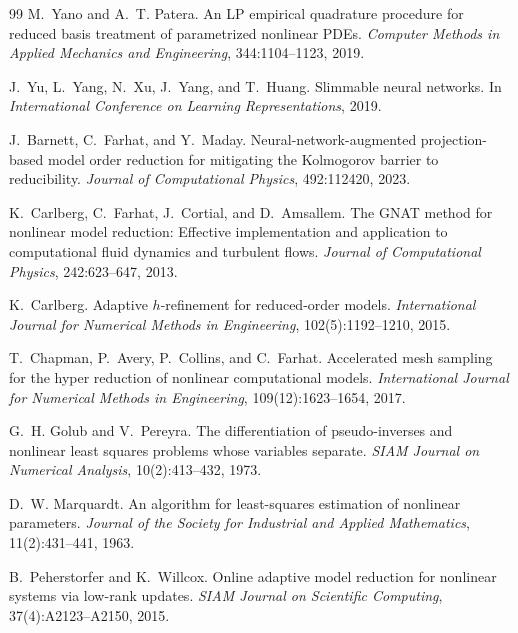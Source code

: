 \begin{thebibliography}{99}
M.~Yano and A.~T. Patera.
\newblock An LP empirical quadrature procedure for reduced basis
treatment of parametrized nonlinear PDEs.
\newblock \emph{Computer Methods in Applied Mechanics and Engineering},
344:1104--1123, 2019.

J.~Yu, L.~Yang, N.~Xu, J.~Yang, and T.~Huang.
\newblock Slimmable neural networks.
\newblock In \emph{International Conference on Learning Representations},
2019.


J.~Barnett, C.~Farhat, and Y.~Maday.
\newblock Neural-network-augmented projection-based model order reduction for
mitigating the Kolmogorov barrier to reducibility.
\newblock \emph{Journal of Computational Physics}, 492:112420, 2023.

K.~Carlberg, C.~Farhat, J.~Cortial, and D.~Amsallem.
\newblock The {GNAT} method for nonlinear model reduction: Effective
implementation and application to computational fluid dynamics and turbulent
flows.
\newblock \emph{Journal of Computational Physics}, 242:623--647, 2013.

K.~Carlberg.
\newblock Adaptive $h$-refinement for reduced-order models.
\newblock \emph{International Journal for Numerical Methods in Engineering},
102(5):1192--1210, 2015.

T.~Chapman, P.~Avery, P.~Collins, and C.~Farhat.
\newblock Accelerated mesh sampling for the hyper reduction of nonlinear
computational models.
\newblock \emph{International Journal for Numerical Methods in Engineering},
109(12):1623--1654, 2017.

G.~H. Golub and V.~Pereyra.
\newblock The differentiation of pseudo-inverses and nonlinear least squares
problems whose variables separate.
\newblock \emph{SIAM Journal on Numerical Analysis}, 10(2):413--432, 1973.

D.~W. Marquardt.
\newblock An algorithm for least-squares estimation of nonlinear parameters.
\newblock \emph{Journal of the Society for Industrial and Applied Mathematics},
11(2):431--441, 1963.

B.~Peherstorfer and K.~Willcox.
\newblock Online adaptive model reduction for nonlinear systems via low-rank
updates.
\newblock \emph{SIAM Journal on Scientific Computing}, 37(4):A2123--A2150, 2015.


\end{thebibliography}
